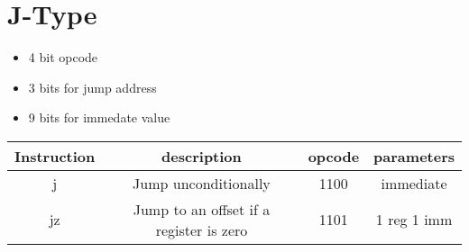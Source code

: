 \documentclass[a4paper]{article}
\begin{document}
\section{J-Type}

\begin{itemize}
\item 4 bit opcode
\item 3 bits for jump address
\item 9 bits for immedate value
\end{itemize}


\begin{center}
\begin{tabular}{| c | c | c | c |}
\hline
Instruction & description & opcode & parameters \\ \hline
j & Jump unconditionally & 1100 & immediate \\ \hline
jz & Jump to an offset if a register is zero & 1101 & 1 reg 1 imm \\ \hline
\end{tabular}
\end{center}
\end{document}
